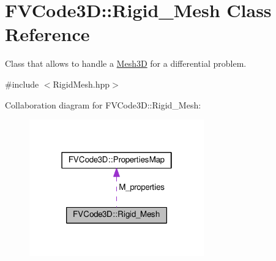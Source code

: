 \hypertarget{classFVCode3D_1_1Rigid__Mesh}{}\section{F\+V\+Code3D\+:\+:Rigid\+\_\+\+Mesh Class Reference}
\label{classFVCode3D_1_1Rigid__Mesh}


Class that allows to handle a \hyperlink{classFVCode3D_1_1Mesh3D}{Mesh3D} for a differential problem.  




{\ttfamily \#include $<$Rigid\+Mesh.\+hpp$>$}



Collaboration diagram for F\+V\+Code3D\+:\+:Rigid\+\_\+\+Mesh\+:
\nopagebreak
\begin{figure}[H]
\begin{center}
\leavevmode
\includegraphics[width=214pt]{classFVCode3D_1_1Rigid__Mesh__coll__graph}
\end{center}
\end{figure}
